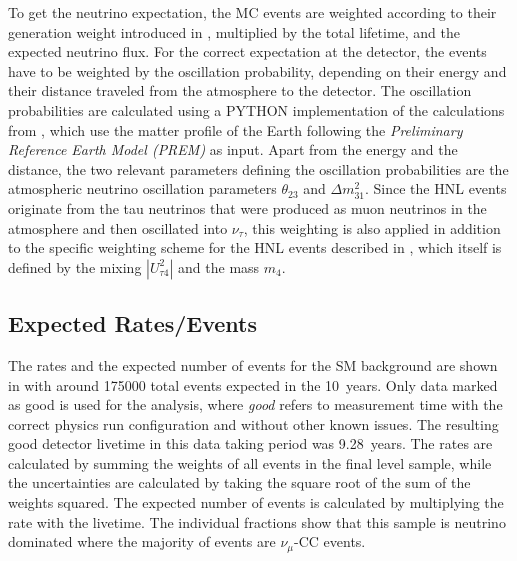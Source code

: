 To get the neutrino expectation, the MC events are weighted according to their generation weight introduced in , multiplied by the total lifetime, and the expected neutrino flux. For the correct expectation at the detector, the events have to be weighted by the oscillation probability, depending on their energy and their distance traveled from the atmosphere to the detector. The oscillation probabilities are calculated using a \textsc{PYTHON} implementation of the calculations from , which use the matter profile of the Earth following the \textit{Preliminary Reference Earth Model (PREM)}  as input. Apart from the energy and the distance, the two relevant parameters defining the oscillation probabilities are the atmospheric neutrino oscillation parameters $\theta_{23}$ and $\Delta m^{2}_{31}$. Since the HNL events originate from the tau neutrinos that were produced as muon neutrinos in the atmosphere and then oscillated into $\nu_\tau$, this weighting is also applied in addition to the specific weighting scheme for the HNL events described in , which itself is defined by the mixing $|U_{\tau4}^2|$ and the mass $m_4$.


\subsection{Expected Rates/Events}

The rates and the expected number of events for the SM background are shown in  with around 175000 total events expected in the \SI{10}{years}. Only data marked as good is used for the analysis, where \textit{good} refers to measurement time with the correct physics run configuration and without other known issues. The resulting good detector livetime in this data taking period was \SI{9.28}{years}. The rates are calculated by summing the weights of all events in the final level sample, while the uncertainties are calculated by taking the square root of the sum of the weights squared. The expected number of events is calculated by multiplying the rate with the livetime. The individual fractions show that this sample is neutrino dominated where the majority of events are $\nu_\mu$-CC events.

